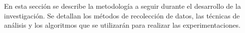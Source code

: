 En esta sección se describe la metodología a seguir durante el desarrollo de la investigación. Se detallan los métodos de recolección de datos, las técnicas de análisis y los algoritmos que se utilizarán para realizar las experimentaciones.
\cite{simpson2019largeannotatedmedicalimage}
